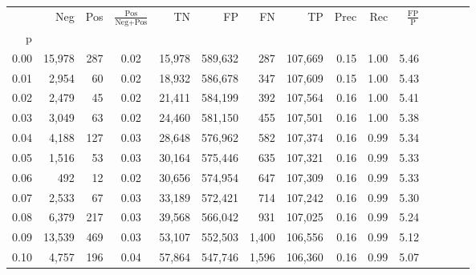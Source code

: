 \begin{tabular}{rrrcrrrrrrrrrrr}
\toprule
{} &     Neg &    Pos & $\frac{\text{Pos}}{\text{Neg}+\text{Pos}}$ &       TN &       FP &       FN &       TP &  Prec &   Rec & $\frac{\text{FP}}{\text{P}}$ \\
p    &         &        &                                            &          &          &          &          &       &       &                              \\
\midrule
0.00 &  15,978 &    287 &                                       0.02 &   15,978 &  589,632 &      287 &  107,669 &  0.15 &  1.00 &                         5.46 \\
0.01 &   2,954 &     60 &                                       0.02 &   18,932 &  586,678 &      347 &  107,609 &  0.15 &  1.00 &                         5.43 \\
0.02 &   2,479 &     45 &                                       0.02 &   21,411 &  584,199 &      392 &  107,564 &  0.16 &  1.00 &                         5.41 \\
0.03 &   3,049 &     63 &                                       0.02 &   24,460 &  581,150 &      455 &  107,501 &  0.16 &  1.00 &                         5.38 \\
0.04 &   4,188 &    127 &                                       0.03 &   28,648 &  576,962 &      582 &  107,374 &  0.16 &  0.99 &                         5.34 \\
0.05 &   1,516 &     53 &                                       0.03 &   30,164 &  575,446 &      635 &  107,321 &  0.16 &  0.99 &                         5.33 \\
0.06 &     492 &     12 &                                       0.02 &   30,656 &  574,954 &      647 &  107,309 &  0.16 &  0.99 &                         5.33 \\
0.07 &   2,533 &     67 &                                       0.03 &   33,189 &  572,421 &      714 &  107,242 &  0.16 &  0.99 &                         5.30 \\
0.08 &   6,379 &    217 &                                       0.03 &   39,568 &  566,042 &      931 &  107,025 &  0.16 &  0.99 &                         5.24 \\
0.09 &  13,539 &    469 &                                       0.03 &   53,107 &  552,503 &    1,400 &  106,556 &  0.16 &  0.99 &                         5.12 \\
0.10 &   4,757 &    196 &                                       0.04 &   57,864 &  547,746 &    1,596 &  106,360 &  0.16 &  0.99 &                         5.07 \\

\end{tabular}
